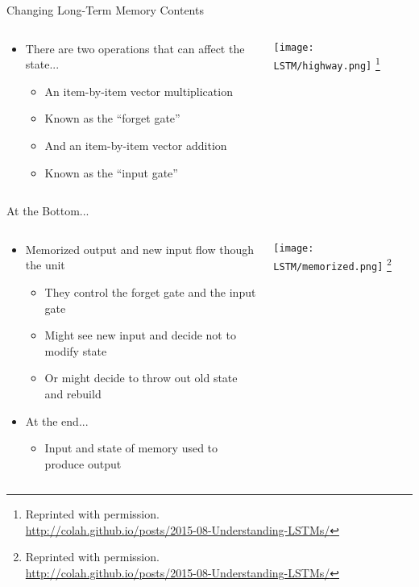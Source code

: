 \documentclass[aspectratio=169]{beamer}
\begin{document}
\begin{frame}{Changing Long-Term Memory Contents}

\begin{columns}
\begin{column}{0.6\textwidth}
\begin{itemize}
	\item There are two operations that can affect the state...
	\begin{itemize}
	\item An item-by-item vector multiplication
	\item Known as the ``forget gate''
	\item And an item-by-item vector addition
	\item Known as the ``input gate''
	\end{itemize}
\end{itemize}
\end{column}
\begin{column}{0.4\textwidth}
\texttt{[image: LSTM/highway.png]}
\footnote{Reprinted with permission.\\ \hspace{1.7em}\url{http://colah.github.io/posts/2015-08-Understanding-LSTMs/}}
\end{column}
\end{columns}
\end{frame}
\begin{frame}{At the Bottom...}

\begin{columns}
\begin{column}{0.5\textwidth}
\begin{itemize}
	\item Memorized output and new input flow though the unit
        \begin{itemize}
        \item They control the forget gate and the input gate
        \item Might see new input and decide not to modify state
        \item Or might decide to throw out old state and rebuild
        \end{itemize}
	\item At the end...
	\begin{itemize}
	\item Input and state of memory used to produce output
	\end{itemize}
\end{itemize}
\end{column}
\begin{column}{0.5\textwidth}
\texttt{[image: LSTM/memorized.png]}
\footnote{Reprinted with permission.\\ \hspace{1.7em}\url{http://colah.github.io/posts/2015-08-Understanding-LSTMs/}}
\end{column}
\end{columns}
\end{frame}
\end{document}
